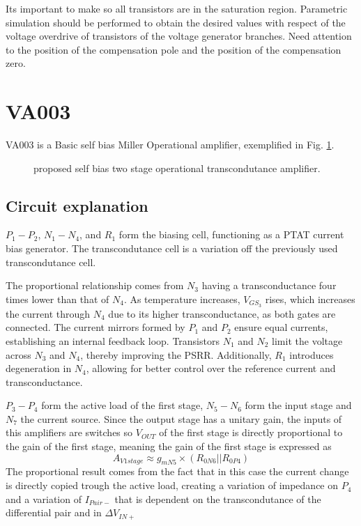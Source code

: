 \documentclass[12pt]{article}
\begin{document}
Its important to make so all transistors are in the saturation region.  Parametric simulation should be performed to obtain the desired values with respect of the voltage overdrive of transistors of the voltage generator branches. Need attention to the position of the compensation pole and the position of the compensation zero.


\section{VA003}

VA003 is a Basic self bias Miller Operational amplifier, exemplified in Fig. \ref{VA003}.
\begin{figure}[H]
        \centering
        
        \caption{proposed self bias two stage operational transcondutance amplifier.}
        \label{VA003}
\end{figure}



\subsection{Circuit explanation}
$P_1 - P_2$, $N_1 - N_4$, and $R_1$ form the biasing cell, functioning as a PTAT current bias generator.  The transcondutance cell is a variation off the previously used transcondutance cell.

The proportional relationship comes from $N_3$ having a transconductance four times lower than that of $N_4$. As temperature increases, $V_{GS_3}$ rises, which increases the current through $N_4$ due to its higher transconductance, as both gates are connected. The current mirrors formed by $P_1$ and $P_2$ ensure equal currents, establishing an internal feedback loop. Transistors $N_1$ and $N_2$ limit the voltage across $N_3$ and $N_4$, thereby improving the PSRR. Additionally, $R_1$ introduces degeneration in $N_4$, allowing for better control over the reference current and transconductance.


$P_3-P_4$ form the active load of the first stage, $N_5-N_6$ form the input stage and $N_7$ the current source.
Since the output stage has a unitary gain, the inputs of this amplifiers are switches so $V_{OUT}$ of the first stage is directly proportional to the gain of the first stage, meaning the gain of the first stage is expressed as
\begin{equation}
    A_{V1stage} \approx g_{mN5} \times (R_{0N6}||R_{0P4})
\end{equation}
The proportional result comes from the fact that in this case the current change is directly copied trough the active load, creating a variation of impedance on $P_4$ and a variation of $I_{Pair-}$ that is dependent on the transcondutance of the differential pair and in $\Delta V_{IN+}$
\end{document}
